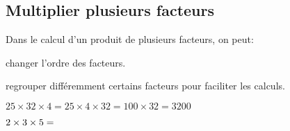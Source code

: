 	\subsection{Multiplier plusieurs facteurs}
\begin{aconnaitre}
Dans le calcul d'un produit de plusieurs facteurs, on peut:

\hspace{2em}\textbullet\hspace{.25em} changer l'ordre des facteurs.

\hspace{2em}\textbullet\hspace{.25em} regrouper différemment certains facteurs pour faciliter les calculs.
\end{aconnaitre}
\begin{methode*1}[]
\begin{exemple*1}

$25 \times 32 \times 4=25 \times 4 \times 32=100  \times 32 = 3200$
\end{exemple*1}

\exercice

$2 \times 3 \times 5= \dotfill$
\end{methode*1}
	
